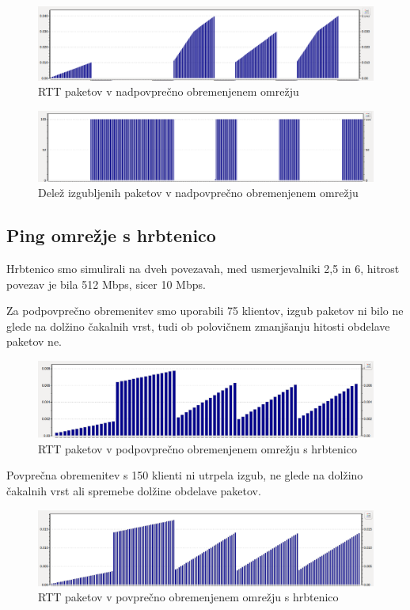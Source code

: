 \documentclass[a4paper,11pt]{article}
\begin{document}
\begin{figure}[h]
	\centering
	\includegraphics[width=\textwidth]{hRtt1.png}
	\caption{RTT paketov v nadpovprečno obremenjenem omrežju}
	\label{RTT3}	
\end{figure}

\begin{figure}[h]
	\centering
	\includegraphics[width=\textwidth]{hPL1.png}
	\caption{Delež izgubljenih paketov v nadpovprečno obremenjenem omrežju}
	\label{hPL1}	
\end{figure}


\subsection{Ping omrežje s hrbtenico} \par

Hrbtenico smo simulirali na dveh povezavah, med usmerjevalniki 2,5 in 6, hitrost povezav je bila 512 Mbps, sicer 10 Mbps. \par

Za podpovprečno obremenitev smo uporabili 75 klientov, izgub paketov ni bilo ne glede na dolžino čakalnih vrst, tudi ob polovičnem zmanjšanju hitosti obdelave paketov ne. 

\begin{figure}[h]
	\centering
	\includegraphics[width=\textwidth]{lRtt2.png}
	\caption{RTT paketov v podpovprečno obremenjenem omrežju s hrbtenico}
	\label{RTT4}	
\end{figure}

Povprečna obremenitev s 150 klienti ni utrpela izgub, ne glede na dolžino čakalnih vrst ali spremebe dolžine obdelave paketov.
\begin{figure}[h]
	\centering
	\includegraphics[width=\textwidth]{aRtt2.png}
	\caption{RTT paketov v povprečno obremenjenem omrežju s hrbtenico}
	\label{RTT5}	
\end{figure}
\end{document}

